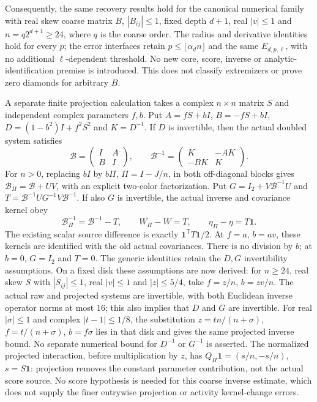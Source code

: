 \documentclass[11pt]{article}
\begin{document}
Consequently, the same recovery results hold for the canonical numerical family with real skew coarse matrix $B$, $|B_{ij}|\le1$, fixed depth $d+1$, real $|v|\le1$ and $n=q2^{d+1}\ge24$, where $q$ is the coarse order. The radius and derivative identities hold for every $p$; the error interfaces retain $p\le\lfloor\alpha_dn\rfloor$ and the same $E_{d,p,\ell}$, with no additional $\ell$-dependent threshold. No new core, score, inverse or analytic-identification premise is introduced. This does not classify extremizers or prove zero diamonds for arbitrary $B$.

A separate finite projection calculation takes a complex $n\times n$ matrix $S$ and independent complex parameters $f,b$. Put $A=fS+bI$, $B=-fS+bI$, $D=(1-b^2)I+f^2S^2$ and $K=D^{-1}$. If $D$ is invertible, then the actual doubled system satisfies
\[
 \mathcal B=\begin{pmatrix}I&A\\B&I\end{pmatrix},\qquad
 \mathcal B^{-1}=\begin{pmatrix}K&-AK\\-BK&K\end{pmatrix}.
\]
For $n>0$, replacing $bI$ by $b\Pi$, $\Pi=I-J/n$, in both off-diagonal blocks gives $\mathcal B_\Pi=\mathcal B+UV$, with an explicit two-color factorization. Put $G=I_2+V\mathcal B^{-1}U$ and $T=\mathcal B^{-1}UG^{-1}V\mathcal B^{-1}$. If also $G$ is invertible, the actual inverse and covariance kernel obey
\[
 \mathcal B_\Pi^{-1}=\mathcal B^{-1}-T,\qquad
 W_\Pi-W=T,\qquad \eta_\Pi-\eta=T\mathbf1.
\]
The existing scalar source difference is exactly $\mathbf1^{\mathsf T}T\mathbf1/2$. At $f=a$, $b=av$, these kernels are identified with the old actual covariances. There is no division by $b$; at $b=0$, $G=I_2$ and $T=0$. The generic identities retain the $D,G$ invertibility assumptions. On a fixed disk these assumptions are now derived: for $n\ge24$, real skew $S$ with $|S_{ij}|\le1$, real $|v|\le1$ and $|z|\le5/4$, take $f=z/n$, $b=zv/n$. The actual raw and projected systems are invertible, with both Euclidean inverse operator norms at most $16$; this also implies that $D$ and $G$ are invertible. For real $|\sigma|\le1$ and complex $|t-1|\le1/8$, the substitution $z=tn/(n+\sigma)$, $f=t/(n+\sigma)$, $b=f\sigma$ lies in that disk and gives the same projected inverse bound. No separate numerical bound for $D^{-1}$ or $G^{-1}$ is asserted. The normalized projected interaction, before multiplication by $z$, has $Q_\Pi\mathbf1=(s/n,-s/n)$, $s=S\mathbf1$: projection removes the constant parameter contribution, not the actual score source. No score hypothesis is needed for this coarse inverse estimate, which does not supply the finer entrywise projection or activity kernel-change errors.
\end{document}
